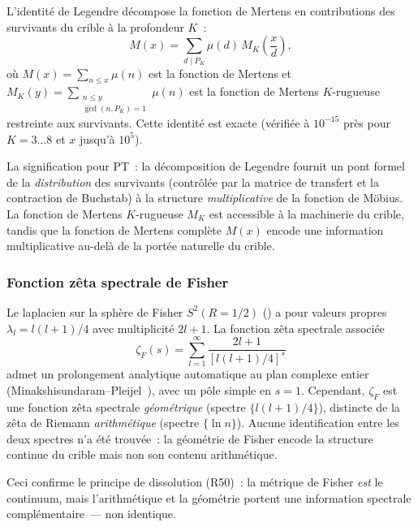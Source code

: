\documentclass[12pt,a4paper]{article}
\begin{document}
L'identité de Legendre décompose la fonction de Mertens en
contributions des survivants du crible à la profondeur $K$~:
\begin{equation}
  M(x) = \sum_{d \mid P_K} \mu(d)\,M_K\!\left(\frac{x}{d}\right),
  \label{eq:legendre_bridge}
\end{equation}
où $M(x) = \sum_{n \leq x} \mu(n)$ est la fonction de Mertens et
$M_K(y) = \sum_{\substack{n \leq y \\ \gcd(n, P_K) = 1}} \mu(n)$
est la fonction de Mertens $K$-rugueuse restreinte aux survivants.
Cette identité est exacte (vérifiée à $10^{-15}$ près pour
$K = 3\ldots 8$ et $x$ jusqu'à $10^5$).

La signification pour PT~: la décomposition de Legendre fournit un
pont formel de la \emph{distribution} des survivants (contrôlée par
la matrice de transfert et la contraction de Buchstab) à la structure
\emph{multiplicative} de la fonction de Möbius. La fonction de
Mertens $K$-rugueuse $M_K$ est accessible à la machinerie du crible,
tandis que la fonction de Mertens complète $M(x)$ encode une
information multiplicative au-delà de la portée naturelle du crible.

\subsubsection{Fonction zêta spectrale de Fisher}
\label{subsec:ch7_fisher_zeta}

Le laplacien sur la sphère de Fisher $S^2(R = 1/2)$
(\cite{companion_M2}) a pour valeurs propres $\lambda_l = l(l+1)/4$
avec multiplicité $2l+1$. La fonction zêta spectrale associée
\begin{equation}
  \zeta_F(s) = \sum_{l=1}^\infty \frac{2l+1}{[l(l+1)/4]^s}
  \label{eq:zeta_fisher}
\end{equation}
admet un prolongement analytique automatique au plan complexe entier
(Minakshisundaram--Pleijel~\cite{MinPleijel1949}), avec un pôle
simple en $s = 1$. Cependant, $\zeta_F$ est une fonction zêta
spectrale \emph{géométrique} (spectre $\{l(l+1)/4\}$), distincte de
la zêta de Riemann \emph{arithmétique} (spectre $\{\ln n\}$). Aucune
identification entre les deux spectres n'a été trouvée~: la
géométrie de Fisher encode la structure continue du crible mais non
son contenu arithmétique.

Ceci confirme le principe de dissolution (R50)~: la métrique de
Fisher \emph{est} le continuum, mais l'arithmétique et la géométrie
portent une information spectrale complémentaire~--- non identique.
\end{document}
